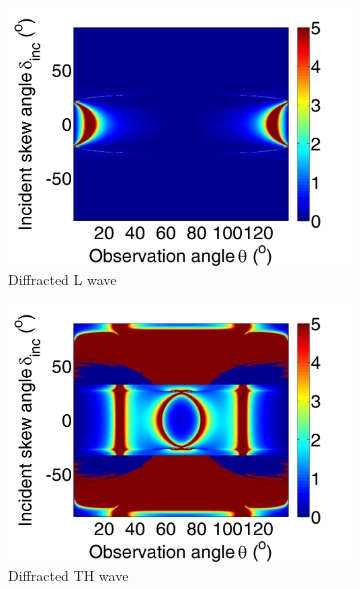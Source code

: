 \begin{figure}[h]
\centering
\begin{subfigure}[b]{0.32\textwidth}
        \includegraphics[width=\textwidth]{images/chapter4/Resultats_3D/XpropL_140_70_TH.png}
        \caption{Diffracted L wave}
        \label{Resultat_3D:DL}
    \end{subfigure}
\begin{subfigure}[b]{0.32\textwidth}
        \includegraphics[width=\textwidth]{images/chapter4/Resultats_3D/XpropTH_140_70_TH.png}
        \caption{Diffracted TH wave}
        \label{Resultat_3D:DTH}
    \end{subfigure}
   \begin{subfigure}[b]{0.32\textwidth}

\end{subfigure}
\end{figure}
